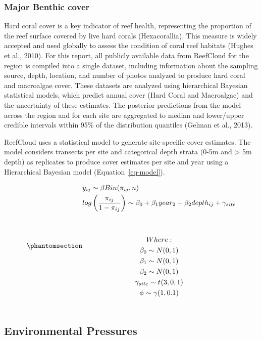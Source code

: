 \documentclass[
  letterpaper,
  DIV=11,
  numbers=noendperiod]{scrartcl}
\begin{document}
\subsubsection{Major Benthic cover}\label{major-benthic-cover}

Hard coral cover is a key indicator of reef health, representing the
proportion of the reef surface covered by live hard corals
(Hexacorallia). This measure is widely accepted and used globally to
assess the condition of coral reef habitats (Hughes et al., 2010). For
this report, all publicly available data from ReefCloud for the region
is compiled into a single dataset, including information about the
sampling source, depth, location, and number of photos analyzed to
produce hard coral and macroalgae cover. These datasets are analyzed
using hierarchical Bayesian statistical models, which predict annual
cover (Hard Coral and Macroalgae) and the uncertainty of these
estimates. The posterior predictions from the model across the region
and for each site are aggregated to median and lower/upper credible
intervals within 95\% of the distribution quantiles (Gelman et al.,
2013).

ReefCloud uses a statistical model to generate site-specific cover
estimates. The model considers transects per site and categorical depth
strata (0-5m and \textgreater{} 5m depth) as replicates to produce cover
estimates per site and year using a Hierarchical Bayesian model
(Equation~\ref{eq-model}).

\begin{equation}\phantomsection\label{eq-model}{
\begin{multlined}
y_{ij} \sim{} \beta_{}Bin(\pi_{ij},n) \\
log\left(\frac{\pi_{ij}}{1-\pi_{ij}}\right) \sim{} \beta_0  + \beta_1year_2 + \beta_2depth_{ij} + \gamma_{site}
\\
\\
\\Where:
\\
\beta_0 \sim{} N (0,1) 
\\
\beta_1 \sim{} N (0,1) 
\\
\beta_2 \sim{} N (0,1) 
\\
\gamma_{site} \sim{} t_{}(3,0,1) 
\\
\phi_{} \sim{} \gamma_{}(1,0.1)
\\
\end{multlined}
}\end{equation}

\subsection{Environmental Pressures}\label{environmental-pressures}
\end{document}

